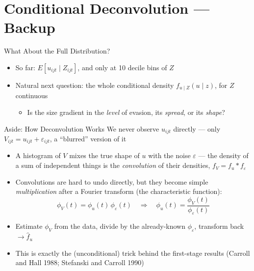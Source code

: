 \documentclass[
  ignorenonframetext,
  aspectratio=169,
]{beamer}
\providecommand{\tightlist}{%
  \setlength{\itemsep}{0pt}\setlength{\parskip}{0pt}}
\begin{document}
\section{Conditional Deconvolution ---
Backup}\label{conditional-deconvolution-backup}

\begin{frame}{What About the Full Distribution?}
\protect{}\label{sec-cond-deconv-appendix}
\begin{itemize}
\item
  So far: \(E[u_{ijt}\mid Z_{ijt}]\), and only at 10 decile bins of
  \(Z\)
\item
  Natural next question: the whole conditional density
  \(f_{u\mid Z}(u\mid z)\), for \(Z\) continuous

  \begin{itemize}
  \tightlist
  \item
    Is the size gradient in the \emph{level} of evasion, its
    \emph{spread}, or its \emph{shape}?
  \end{itemize}
\end{itemize}
\end{frame}

\begin{frame}{Aside: How Deconvolution Works}
\protect{}\label{aside-how-deconvolution-works}
We never observe \(u_{ijt}\) directly --- only
\(V_{ijt}=u_{ijt}+\varepsilon_{ijt}\), a ``blurred'' version of it

\begin{itemize}
\item
  A histogram of \(V\) mixes the true shape of \(u\) with the noise
  \(\varepsilon\) --- the density of a sum of independent things is the
  \emph{convolution} of their densities, \(f_V=f_u * f_\varepsilon\)
\item
  Convolutions are hard to undo directly, but they become simple
  \emph{multiplication} after a Fourier transform (the characteristic
  function): \[
  \phi_V(t)=\phi_u(t)\,\phi_\varepsilon(t) \quad\Longrightarrow\quad \phi_u(t)=\frac{\phi_V(t)}{\phi_\varepsilon(t)}
  \]
\item
  Estimate \(\phi_V\) from the data, divide by the already-known
  \(\phi_\varepsilon\), transform back \(\to \hat f_u\)
\item
  This is exactly the (unconditional) trick behind the first-stage
  results (Carroll and Hall 1988; Stefanski and Carroll 1990)
\end{itemize}
\end{frame}
\end{document}
